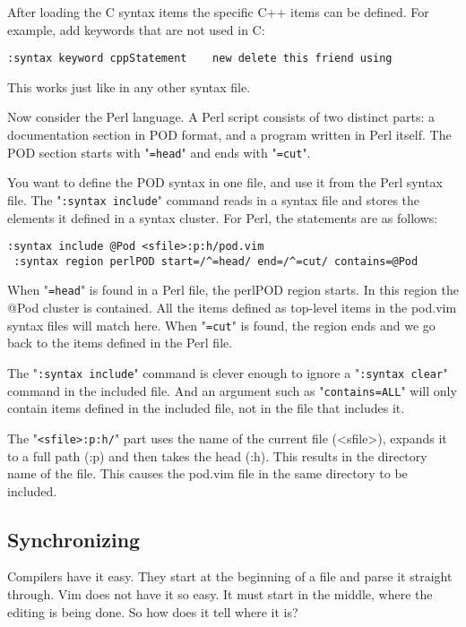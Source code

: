After loading the C syntax items the specific C++ items can be defined.
For example, add keywords that are not used in C:

\begin{Verbatim}[samepage=true]
 :syntax keyword cppStatement    new delete this friend using
\end{Verbatim}

This works just like in any other syntax file.

Now consider the Perl language.
A Perl script consists of two distinct parts: a documentation section in POD format, and a program written in Perl itself.
The POD section starts with "\verb!=head!" and ends with "\verb!=cut!".

You want to define the POD syntax in one file, and use it from the Perl syntax file.
The "\verb!:syntax include!" command reads in a syntax file and stores the elements it defined in a syntax cluster.
For Perl, the statements are as follows:

\begin{Verbatim}[samepage=true]
 :syntax include @Pod <sfile>:p:h/pod.vim
 :syntax region perlPOD start=/^=head/ end=/^=cut/ contains=@Pod
\end{Verbatim}

When "\verb!=head!" is found in a Perl file, the perlPOD region starts.
In this region the @Pod cluster is contained.
All the items defined as top-level items in the pod.vim syntax files will match here.
When "\verb!=cut!" is found, the region ends and we go back to the items defined in the Perl file.

The "\verb!:syntax include!" command is clever enough to ignore a "\verb!:syntax clear!" command in the included file.
And an argument such as "\verb!contains=ALL!" will only contain items defined in the included file, not in the file that includes it.

The "\verb!<sfile>:p:h/!" part uses the name of the current file (<sfile>), expands it to a full path (:p) and then takes the head (:h).
This results in the directory name of the file.
This causes the pod.vim file in the same directory to be included.
\subsection{Synchronizing}
Compilers have it easy.
They start at the beginning of a file and parse it straight through.
Vim does not have it so easy.
It must start in the middle, where the editing is being done.
So how does it tell where it is?

